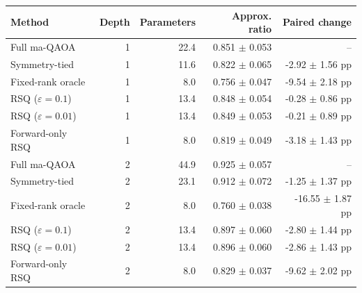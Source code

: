 \begin{tabular}{lrrrr}
\toprule
Method & Depth & Parameters & Approx. ratio & Paired change \\
\midrule
Full ma-QAOA & 1 & 22.4 & 0.851 $\pm$ 0.053 & -- \\
Symmetry-tied & 1 & 11.6 & 0.822 $\pm$ 0.065 & -2.92 $\pm$ 1.56 pp \\
Fixed-rank oracle & 1 & 8.0 & 0.756 $\pm$ 0.047 & -9.54 $\pm$ 2.18 pp \\
RSQ ($\varepsilon=0.1$) & 1 & 13.4 & 0.848 $\pm$ 0.054 & -0.28 $\pm$ 0.86 pp \\
RSQ ($\varepsilon=0.01$) & 1 & 13.4 & 0.849 $\pm$ 0.053 & -0.21 $\pm$ 0.89 pp \\
Forward-only RSQ & 1 & 8.0 & 0.819 $\pm$ 0.049 & -3.18 $\pm$ 1.43 pp \\
\addlinespace
Full ma-QAOA & 2 & 44.9 & 0.925 $\pm$ 0.057 & -- \\
Symmetry-tied & 2 & 23.1 & 0.912 $\pm$ 0.072 & -1.25 $\pm$ 1.37 pp \\
Fixed-rank oracle & 2 & 8.0 & 0.760 $\pm$ 0.038 & -16.55 $\pm$ 1.87 pp \\
RSQ ($\varepsilon=0.1$) & 2 & 13.4 & 0.897 $\pm$ 0.060 & -2.80 $\pm$ 1.44 pp \\
RSQ ($\varepsilon=0.01$) & 2 & 13.4 & 0.896 $\pm$ 0.060 & -2.86 $\pm$ 1.43 pp \\
Forward-only RSQ & 2 & 8.0 & 0.829 $\pm$ 0.037 & -9.62 $\pm$ 2.02 pp \\
\bottomrule
\end{tabular}
